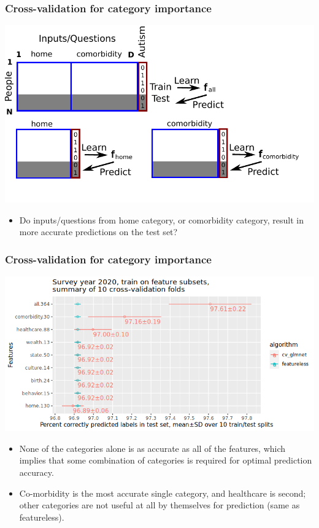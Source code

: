\documentclass{beamer}
\begin{document}
\begin{frame}
  \frametitle{Cross-validation for category importance}
  \includegraphics[width=\textwidth]{drawing-cv-feature-sets.pdf}

  \begin{itemize}
  \item Do inputs/questions from home category, or comorbidity
    category, result in more accurate predictions on the test set?
  \end{itemize}
\end{frame}

\begin{frame}
  \frametitle{Cross-validation for category importance}
  \includegraphics[width=\textwidth]{download-nsch-mlr3batchmark-registry-one-set-compare-features.png}

  \begin{itemize}
  \item None of the categories alone is as accurate as all of the
    features, which implies that some combination of categories is
    required for optimal prediction accuracy.
  \item Co-morbidity is the most accurate single category, and
    healthcare is second; other categories are not useful at all by
    themselves for prediction (same as featureless).
  \end{itemize}

\end{frame}
\end{document}
